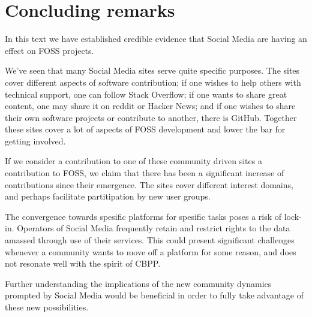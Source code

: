\documentclass[a4paper,11pt]{article} %
\begin{document}
\section{Concluding remarks}

In this text we have established credible evidence that Social Media
are having an effect on FOSS projects.

We've seen that many Social Media sites serve quite specific
purposes. The sites cover different aspects of software contribution;
if one wishes to help others with technical support, one can follow
Stack Overflow; if one wants to share great content, one may share it
on reddit or Hacker News; and if one wishes to share their own
software projects or contribute to another, there is GitHub. Together
these sites cover a lot of aspects of FOSS development and lower the
bar for getting involved.

If we consider a contribution to one of these community driven sites a
contribution to FOSS, we claim that there has been a significant
increase of contributions since their emergence. The sites cover
different interest domains, and perhaps facilitate partitipation by
new user groups.

The convergence towards spesific platforms for spesific tasks poses a
risk of lock-in. Operators of Social Media frequently retain and
restrict rights to the data amassed through use of their
services. This could present significant challenges whenever a
community wants to move off a platform for some reason, and does not
resonate well with the spirit of CBPP.

Further understanding the implications of the new community dynamics
prompted by Social Media would be beneficial in order to fully take
advantage of these new possibilities.


\newpage
\printbibliography
\end{document}
